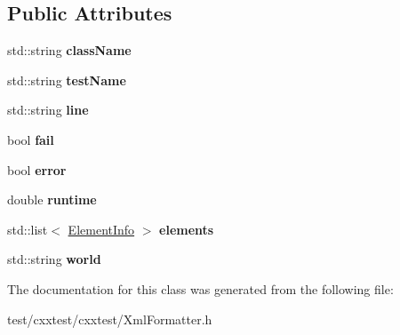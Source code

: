 \subsection*{Public Attributes}
\begin{DoxyCompactItemize}
\item 
\hypertarget{classCxxTest_1_1TestCaseInfo_afc0b28f2edadcb7558ba3497b999f0da}{std\-::string {\bfseries class\-Name}}\label{classCxxTest_1_1TestCaseInfo_afc0b28f2edadcb7558ba3497b999f0da}

\item 
\hypertarget{classCxxTest_1_1TestCaseInfo_a1cd99a666626a45b6c88a7ee3d8a8882}{std\-::string {\bfseries test\-Name}}\label{classCxxTest_1_1TestCaseInfo_a1cd99a666626a45b6c88a7ee3d8a8882}

\item 
\hypertarget{classCxxTest_1_1TestCaseInfo_a4c41bcdf49a08feecaaf0caf6f8b7095}{std\-::string {\bfseries line}}\label{classCxxTest_1_1TestCaseInfo_a4c41bcdf49a08feecaaf0caf6f8b7095}

\item 
\hypertarget{classCxxTest_1_1TestCaseInfo_a80ff0ae6bcc5288fa521c6e4021f92ec}{bool {\bfseries fail}}\label{classCxxTest_1_1TestCaseInfo_a80ff0ae6bcc5288fa521c6e4021f92ec}

\item 
\hypertarget{classCxxTest_1_1TestCaseInfo_adca02112e6061bb803bc4a99ee3ddc8f}{bool {\bfseries error}}\label{classCxxTest_1_1TestCaseInfo_adca02112e6061bb803bc4a99ee3ddc8f}

\item 
\hypertarget{classCxxTest_1_1TestCaseInfo_a8e4d411f2c74d32e5bb517df5d160583}{double {\bfseries runtime}}\label{classCxxTest_1_1TestCaseInfo_a8e4d411f2c74d32e5bb517df5d160583}

\item 
\hypertarget{classCxxTest_1_1TestCaseInfo_a440029823c46e47daca59882bc23205c}{std\-::list$<$ \hyperlink{classCxxTest_1_1ElementInfo}{Element\-Info} $>$ {\bfseries elements}}\label{classCxxTest_1_1TestCaseInfo_a440029823c46e47daca59882bc23205c}

\item 
\hypertarget{classCxxTest_1_1TestCaseInfo_a02fa0e0f3128e70cef7360111bb2d0b4}{std\-::string {\bfseries world}}\label{classCxxTest_1_1TestCaseInfo_a02fa0e0f3128e70cef7360111bb2d0b4}

\end{DoxyCompactItemize}


The documentation for this class was generated from the following file\-:\begin{DoxyCompactItemize}
\item 
test/cxxtest/cxxtest/Xml\-Formatter.\-h\end{DoxyCompactItemize}
